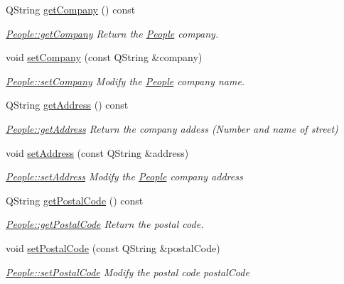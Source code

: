\begin{DoxyCompactItemize}
Q\-String \hyperlink{classModels_1_1People_af4d0cf50ce941c262717b6f10b9d4b89}{get\-Company} () const 
\begin{DoxyCompactList}\small\item\em \hyperlink{classModels_1_1People_af4d0cf50ce941c262717b6f10b9d4b89}{People\-::get\-Company} Return the \hyperlink{classModels_1_1People}{People} company. \end{DoxyCompactList}\item 
void \hyperlink{classModels_1_1People_aded3f48b5afb01c78379c9a63c35d5c3}{set\-Company} (const Q\-String \&company)
\begin{DoxyCompactList}\small\item\em \hyperlink{classModels_1_1People_aded3f48b5afb01c78379c9a63c35d5c3}{People\-::set\-Company} Modify the \hyperlink{classModels_1_1People}{People} {\itshape company} name. \end{DoxyCompactList}\item 
Q\-String \hyperlink{classModels_1_1People_a4d327556f59357912c54c14cf940151d}{get\-Address} () const 
\begin{DoxyCompactList}\small\item\em \hyperlink{classModels_1_1People_a4d327556f59357912c54c14cf940151d}{People\-::get\-Address} Return the company addess (Number and name of street) \end{DoxyCompactList}\item 
void \hyperlink{classModels_1_1People_ab4e49bbc2de9ed31276e50e768c9bdee}{set\-Address} (const Q\-String \&address)
\begin{DoxyCompactList}\small\item\em \hyperlink{classModels_1_1People_ab4e49bbc2de9ed31276e50e768c9bdee}{People\-::set\-Address} Modify the \hyperlink{classModels_1_1People}{People} company {\itshape address} \end{DoxyCompactList}\item 
Q\-String \hyperlink{classModels_1_1People_a30999a844f67ddef254e2c2343df8946}{get\-Postal\-Code} () const 
\begin{DoxyCompactList}\small\item\em \hyperlink{classModels_1_1People_a30999a844f67ddef254e2c2343df8946}{People\-::get\-Postal\-Code} Return the postal code. \end{DoxyCompactList}\item 
void \hyperlink{classModels_1_1People_a89ea420d87ce7e32e8fc1b7a83616eaf}{set\-Postal\-Code} (const Q\-String \&postal\-Code)
\begin{DoxyCompactList}\small\item\em \hyperlink{classModels_1_1People_a89ea420d87ce7e32e8fc1b7a83616eaf}{People\-::set\-Postal\-Code} Modify the postal code {\itshape postal\-Code} \end{DoxyCompactList}\item 

\end{DoxyCompactItemize}
